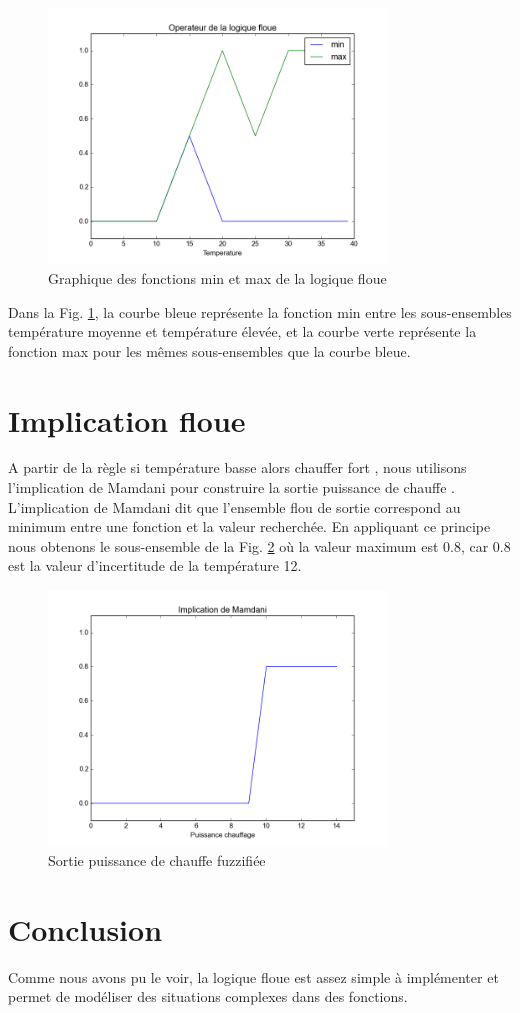 \documentclass[a4paper,11pt]{article}
\begin{document}
\begin{figure}[!h]
  \begin{center}
    \includegraphics[width=9cm]{operateurFlou.png}
    \caption{Graphique des fonctions min et max de la logique floue}
    \label{fig:operateur}
  \end{center}
\end{figure}

Dans la Fig. \ref{fig:operateur}, la courbe bleue représente la fonction min entre les sous-ensembles
température moyenne et température élevée, et la courbe verte représente la fonction max pour les mêmes
sous-ensembles que la courbe bleue.

\section{Implication floue}
A partir de la règle \og si température basse alors chauffer fort \fg , nous utilisons l'implication
de Mamdani pour construire la sortie \og puissance de chauffe \fg . L'implication de Mamdani dit que l'ensemble
flou de sortie correspond au minimum entre une fonction et la valeur recherchée. En appliquant
ce principe nous obtenons le sous-ensemble de la Fig. \ref{fig:mamdani} où la valeur maximum est 0.8, car 0.8 est la valeur 
d'incertitude de la température 12\degre.

\begin{figure}[!h]
  \begin{center}
    \includegraphics[width=9cm]{mamdani.png}
    \caption{Sortie \og puissance de chauffe fuzzifiée \fg}
    \label{fig:mamdani}
  \end{center}
\end{figure}
\newpage
\section{Conclusion}
Comme nous avons pu le voir, la logique floue est assez simple à implémenter et permet de modéliser des situations
complexes dans des fonctions. 
\end{document}
